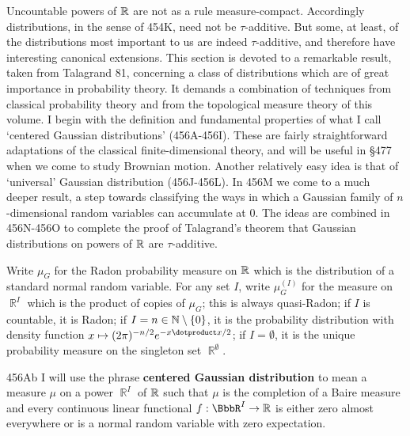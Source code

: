 
\def\chaptername{Perfect measures, disintegrations and processes}
\def\sectionname{Gaussian distributions}


Uncountable powers of $\Bbb R$ are not as a rule
measure-compact.
Accordingly distributions, in
the sense of 454K, need not be $\tau$-additive.   But some, at least,
of the distributions most important to us
are indeed $\tau$-additive, and therefore have interesting canonical
extensions.
This section is devoted to a remarkable result, taken from
{\smc Talagrand 81}, concerning a class of distributions which are of
great importance in probability theory.   It demands a combination of
techniques from classical probability theory and from the topological
measure theory of this volume.   I begin with the definition and
fundamental properties of what I call `centered Gaussian distributions'
(456A-456I).  %
These are fairly straightforward
adaptations of the classical finite-dimensional theory, and
will be useful in \S477 when we come to study Brownian motion.
Another relatively easy idea is that of `universal' Gaussian
distribution (456J-456L).  %
In 456M we come to a much deeper result, a step towards classifying the
ways in which a Gaussian family of $n$-dimensional random variables can
accumulate at $0$.   The ideas are combined in
456N-456O to complete the proof of Talagrand's theorem that Gaussian
distributions on powers of $\Bbb R$ are $\tau$-additive.

 Write $\mu_G$ for the Radon probability
measure on $\Bbb R$ which is the distribution of a standard normal
random variable.   For any set
$I$, write $\mu_G^{(I)}$ for the measure on $\BbbR^I$ which is the
product of copies of $\mu_G$;  this is
always quasi-Radon;  if $I$ is countable, it is
Radon;  if
$I=n\in\Bbb N\setminus\{0\}$, it is the probability distribution with
density function
$x\mapsto(2\pi)^{-n/2}e^{-x\dotproduct x/2}$;
if $I=\emptyset$, it is the unique probability measure on the singleton
set $\BbbR^{\emptyset}$.

\spheader 456Ab I will use the phrase {\bf centered Gaussian
distribution} to mean a measure $\mu$ on a power $\BbbR^I$ of $\Bbb R$
such that $\mu$ is the completion of a Baire measure and every
continuous linear functional $f:\BbbR^I\to\Bbb R$ is either zero almost
everywhere or is a normal random variable with zero
expectation.   

